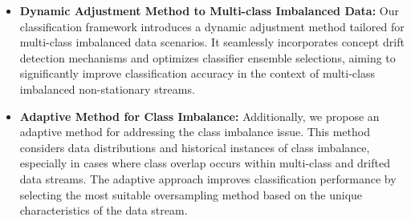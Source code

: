 \begin{itemize}
    \item \textbf{Dynamic Adjustment Method to Multi-class Imbalanced Data:} Our classification framework introduces a dynamic adjustment method tailored for multi-class imbalanced data scenarios. It seamlessly incorporates concept drift detection mechanisms and optimizes classifier ensemble selections, aiming to significantly improve classification accuracy in the context of multi-class imbalanced non-stationary streams.
    \item \textbf{Adaptive Method for Class Imbalance:} Additionally, we propose an adaptive method for addressing the class imbalance issue. This method considers data distributions and historical instances of class imbalance, especially in cases where class overlap occurs within multi-class and drifted data streams. The adaptive approach improves classification performance by selecting the most suitable oversampling method based on the unique characteristics of the data stream.
\end{itemize}
